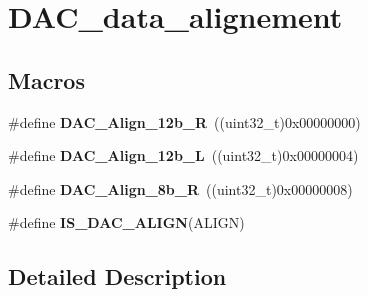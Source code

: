 \hypertarget{group___d_a_c__data__alignement}{\section{D\-A\-C\-\_\-data\-\_\-alignement}
\label{group___d_a_c__data__alignement}
}
\subsection*{Macros}
\begin{DoxyCompactItemize}
\item 
\hypertarget{group___d_a_c__data__alignement_ga0f2a6fc71aaf90a27b0caf1bd06e73f2}{\#define {\bfseries D\-A\-C\-\_\-\-Align\-\_\-12b\-\_\-\-R}~((uint32\-\_\-t)0x00000000)}\label{group___d_a_c__data__alignement_ga0f2a6fc71aaf90a27b0caf1bd06e73f2}

\item 
\hypertarget{group___d_a_c__data__alignement_gaf3a46d37092eac0d4c9c1039e68208d4}{\#define {\bfseries D\-A\-C\-\_\-\-Align\-\_\-12b\-\_\-\-L}~((uint32\-\_\-t)0x00000004)}\label{group___d_a_c__data__alignement_gaf3a46d37092eac0d4c9c1039e68208d4}

\item 
\hypertarget{group___d_a_c__data__alignement_gaa633fbcf85e97e12c4894eaed530dd8f}{\#define {\bfseries D\-A\-C\-\_\-\-Align\-\_\-8b\-\_\-\-R}~((uint32\-\_\-t)0x00000008)}\label{group___d_a_c__data__alignement_gaa633fbcf85e97e12c4894eaed530dd8f}

\item 
\#define {\bfseries I\-S\-\_\-\-D\-A\-C\-\_\-\-A\-L\-I\-G\-N}(A\-L\-I\-G\-N)
\end{DoxyCompactItemize}


\subsection{Detailed Description}


